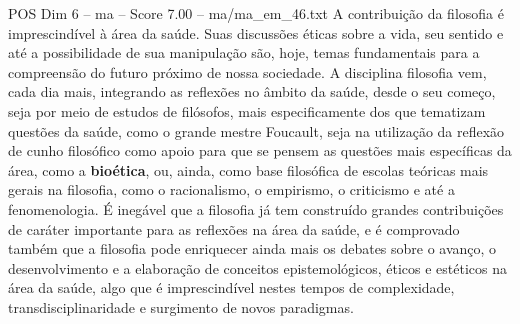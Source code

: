 \begin{textsample}{POS Dim 6 – ma – Score 7.00 – ma/ma\_em\_46.txt}
A contribuição da filosofia é imprescindível à área da saúde.
Suas discussões éticas sobre a vida, seu sentido e até a possibilidade de sua manipulação são, hoje, temas fundamentais para a compreensão do futuro próximo de nossa sociedade.
A disciplina filosofia vem, cada dia mais, integrando as reflexões no âmbito da saúde, desde o seu começo, seja por meio de estudos de filósofos, mais especificamente dos que tematizam questões da saúde, como o grande mestre Foucault, seja na utilização da reflexão de cunho filosófico como apoio para que se pensem as questões mais específicas da área, como a \textbf{bioética}, ou, ainda, como base filosófica de escolas teóricas mais gerais na filosofia, como o racionalismo, o empirismo, o criticismo e até a fenomenologia.
É inegável que a filosofia já tem construído grandes contribuições de caráter importante para as reflexões na área da saúde, e é comprovado também que a filosofia pode enriquecer ainda mais os debates sobre o avanço, o desenvolvimento e a elaboração de conceitos epistemológicos, éticos e estéticos na área da saúde, algo que é imprescindível nestes tempos de complexidade, transdisciplinaridade e surgimento de novos paradigmas.

\end{textsample}
